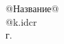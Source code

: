 \begin{titlepage}
    \vspace*{\fill}
    \begin{center}
        {\Huge{@Название@}}\\[0.5cm]
        {\Large{@k.idcr}}\\[0.4cm]
        \the\year{} г.
    \end{center}
    \vspace*{\fill}
\end{titlepage}
